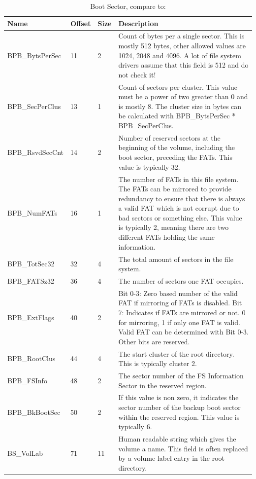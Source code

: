 \begin{table}[!ht]
\caption{Boot Sector, compare to: \cite{usb_ms_jan, fatgen103}}
\centering
\begin{tabular}{|l|l|l|p{9cm}|}
\hline\hline
\textbf{Name} & \textbf{Offset} & \textbf{Size} & \textbf{Description}\\ \hline
BPB\_BytsPerSec & 11 & 2 & Count of bytes per a single sector. This is mostly 512 bytes, other allowed values are 1024, 2048 and 4096. A lot of file system drivers assume that this field is 512 and do not check it! \\ \hline
BPB\_SecPerClus & 13 & 1 & Count of sectors per cluster. This value must be a power of two greater than 0 and is mostly 8. The cluster size in bytes can be calculated with BPB\_BytsPerSec * BPB\_SecPerClus. \\ \hline
BPB\_RsvdSecCnt & 14 & 2 & Number of reserved sectors at the beginning of the volume, including the boot sector, preceding the FATs. This value is typically 32. \\ \hline
BPB\_NumFATs & 16 & 1 & The number of FATs in this file system. The FATs can be mirrored to provide redundancy to ensure that there is always a valid FAT which is not corrupt due to bad sectors or something else. This value is typically 2, meaning there are two different FATs holding the same information. \\ \hline
BPB\_TotSec32 & 32 & 4 & The total amount of sectors in the file system. \\ \hline
BPB\_FATSz32 & 36 & 4 & The number of sectors one FAT occupies. \\ \hline
BPB\_ExtFlags & 40 & 2 & Bit 0-3: Zero based number of the valid FAT if mirroring of FATs is disabled. Bit 7: Indicates if FATs are mirrored or not. 0 for mirroring, 1 if only one FAT is valid. Valid FAT can be determined with Bit 0-3. Other bits are reserved. \\ \hline
BPB\_RootClus & 44 & 4 & The start cluster of the root directory. This is typically cluster 2. \\ \hline
BPB\_FSInfo & 48 & 2 & The sector number of the FS Information Sector in the reserved region. \\ \hline
BPB\_BkBootSec & 50 & 2 & If this value is non zero, it indicates the sector number of the backup boot sector within the reserved region. This value is typically 6. \\ \hline
BS\_VolLab & 71 & 11 & Human readable string which gives the volume a name. This field is often replaced by a volume label entry in the root directory. \\ \hline
\end{tabular}
\label{table:fat_boot_sector}
\end{table}

